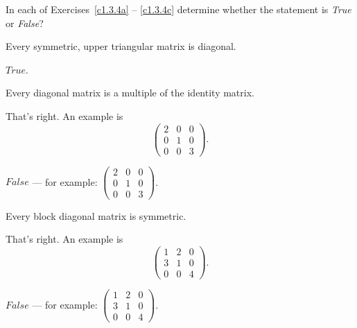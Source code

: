\documentclass{ximera}
\begin{document}
\noindent In each of Exercises~\ref{c1.3.4a} -- \ref{c1.3.4c} determine
whether the statement is {\em True\/} or {\em False\/}?
\begin{exercise} \label{c1.3.4a}
  Every symmetric, upper triangular matrix is diagonal.
  \begin{multipleChoice}
  \end{multipleChoice}

\begin{solution}
\ans $True$.

\end{solution}
\end{exercise}

\begin{exercise} \label{c1.3.4b}
  Every diagonal matrix is a multiple of the identity matrix.
  \begin{multipleChoice}
  \end{multipleChoice}
  \begin{feedback}
    That's right.   An example is
    \[\left(\begin{array}{ccc}
              2 & 0 & 0 \\
              0 & 1 & 0 \\
              0 & 0 & 3 \end{array}\right).\]
  \end{feedback}

\begin{solution}
\ans $False$ --- for example:
$\left(\begin{array}{ccc}
2 & 0 & 0 \\
0 & 1 & 0 \\
0 & 0 & 3 \end{array}\right)$.

\end{solution}
\end{exercise}

\begin{exercise} \label{c1.3.4c}
  Every block diagonal matrix is symmetric.
  \begin{multipleChoice}
  \end{multipleChoice}
  \begin{feedback}
    That's right.   An example is
    \[ \left(\begin{array}{ccc}
               1 & 2 & 0 \\
               3 & 1 & 0 \\
               0 & 0 & 4
             \end{array}\right).
         \]
  \end{feedback}  

\begin{solution}
\ans $False$ --- for example:
$\left(\begin{array}{ccc}
1 & 2 & 0 \\
3 & 1 & 0 \\
0 & 0 & 4
\end{array}\right)$.

\end{solution}
\end{exercise}
\end{document}
